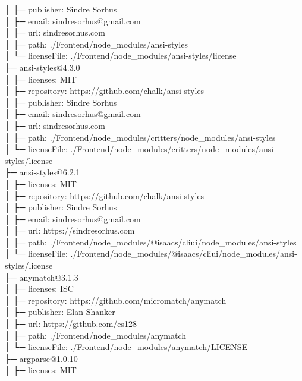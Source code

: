 \documentclass[
    paper=a4,
    twoside=false,
    parskip=half,
    listof=entryprefix,
    listof=totoc,
    index=totoc,
    bibliography=totoc,
    headsepline,
]{scrbook}
\begin{document}
    │  ├─ publisher: Sindre Sorhus\\
    │  ├─ email: sindresorhus@gmail.com\\
    │  ├─ url: sindresorhus.com\\
    │  ├─ path: ./Frontend/node\_modules/ansi-styles\\
    │  └─ licenseFile: ./Frontend/node\_modules/ansi-styles/license\\
    ├─ ansi-styles@4.3.0\\
    │  ├─ licenses: MIT\\
    │  ├─ repository: https://github.com/chalk/ansi-styles\\
    │  ├─ publisher: Sindre Sorhus\\
    │  ├─ email: sindresorhus@gmail.com\\
    │  ├─ url: sindresorhus.com\\
    │  ├─ path: ./Frontend/node\_modules/critters/node\_modules/ansi-styles\\
    │  └─ licenseFile: ./Frontend/node\_modules/critters/node\_modules/ansi-styles/license\\
    ├─ ansi-styles@6.2.1\\
    │  ├─ licenses: MIT\\
    │  ├─ repository: https://github.com/chalk/ansi-styles\\
    │  ├─ publisher: Sindre Sorhus\\
    │  ├─ email: sindresorhus@gmail.com\\
    │  ├─ url: https://sindresorhus.com\\
    │  ├─ path: ./Frontend/node\_modules/@isaacs/cliui/node\_modules/ansi-styles\\
    │  └─ licenseFile: ./Frontend/node\_modules/@isaacs/cliui/node\_modules/ansi-styles/license\\
    ├─ anymatch@3.1.3\\
    │  ├─ licenses: ISC\\
    │  ├─ repository: https://github.com/micromatch/anymatch\\
    │  ├─ publisher: Elan Shanker\\
    │  ├─ url: https://github.com/es128\\
    │  ├─ path: ./Frontend/node\_modules/anymatch\\
    │  └─ licenseFile: ./Frontend/node\_modules/anymatch/LICENSE\\
    ├─ argparse@1.0.10\\
    │  ├─ licenses: MIT\\
\end{document}
